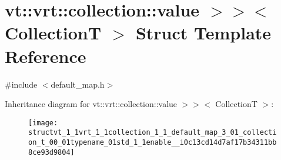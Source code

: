 \hypertarget{structvt_1_1vrt_1_1collection_1_1_default_map_3_01_collection_t_00_01typename_01std_1_1enable__i0c13cd14d7af17b34311bb8ce93d9804}{}\section{vt\+:\+:vrt\+:\+:collection\+:\+:value $>$$>$$<$ CollectionT $>$ Struct Template Reference}
\label{structvt_1_1vrt_1_1collection_1_1_default_map_3_01_collection_t_00_01typename_01std_1_1enable__i0c13cd14d7af17b34311bb8ce93d9804}


{\ttfamily \#include $<$default\+\_\+map.\+h$>$}

Inheritance diagram for vt\+:\+:vrt\+:\+:collection\+:\+:value $>$$>$$<$ CollectionT $>$\+:\begin{figure}[H]
\begin{center}
\leavevmode
\texttt{[image: structvt\_1\_1vrt\_1\_1collection\_1\_1\_default\_map\_3\_01\_collection\_t\_00\_01typename\_01std\_1\_1enable\_\_i0c13cd14d7af17b34311bb8ce93d9804]}
\end{center}
\end{figure}

